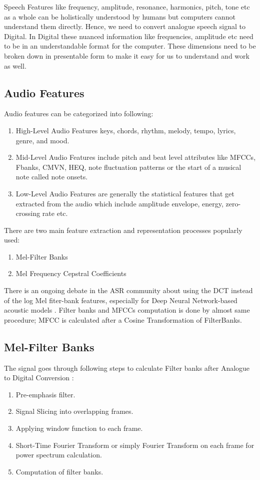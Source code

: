 Speech Features like frequency, amplitude, resonance, harmonics, pitch, tone etc as a whole can be holistically understood by humans but computers cannot understand them directly. Hence, we need to convert analogue speech signal to Digital. In Digital these nuanced information like frequencies, amplitude etc need to be in an understandable format for the computer. These dimensions need to be broken down in presentable form to make it easy for us to understand and work as well. 

\subsection{Audio Features}
Audio features can be categorized into following:
\begin{enumerate}
    \item High-Level Audio Features keys, chords, rhythm, melody, tempo, lyrics, genre, and mood.
    \item Mid-Level Audio Features include pitch and beat level attributes like MFCCs, Fbanks, CMVN, HEQ, note fluctuation patterns or the start of a musical note called note onsets.
    \item Low-Level Audio Features are generally the statistical features that get extracted from the audio which include amplitude envelope, energy, zero-crossing rate etc. 
\end{enumerate}

There are two main feature extraction and representation processes popularly used:
\begin{enumerate}
    \item Mel-Filter Banks
    \item Mel Frequency Cepstral Coefficients
\end{enumerate}

There is an ongoing debate in the ASR community about using the DCT instead of the log Mel fiter-bank features, especially for Deep Neural Network-based acoustic models \cite{raj_note_nodate}. Filter banks and MFCCs computation is done by almost same procedure; MFCC is calculated after a Cosine Transformation of FilterBanks.

\subsection{Mel-Filter Banks}

The signal goes through following steps to calculate Filter banks after Analogue to Digital Conversion \cite{backstrom_introduction_2022}: 
\begin{enumerate}
    \item Pre-emphasis filter.
    \item Signal Slicing into overlapping frames.
    \item Applying window function to each frame.
    \item Short-Time Fourier Transform or simply Fourier Transform on each frame for power spectrum calculation.
    \item Computation of filter banks. 
\end{enumerate}

